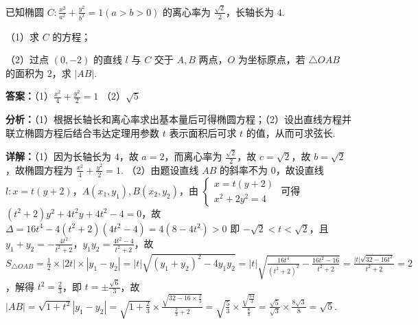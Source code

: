 \begin{question}[points=15]
已知椭圆 $C:\frac{x^2}{a^2}+\frac{y^2}{b^2}=1(a>b>0)$ 的离心率为 $\frac{\sqrt{2}}{2}$，长轴长为 $4$.

（1）求 $C$ 的方程；

（2）过点 $(0,-2)$ 的直线 $l$ 与 $C$ 交于 $A,B$ 两点，$O$ 为坐标原点，若 $\triangle OAB$ 的面积为 $2$，求 $|AB|$.
\begin{solution}
\textbf{答案：}（1）$\frac{x^2}{4}+\frac{y^2}{2}=1$
（2）$\sqrt{5}$

\textbf{分析：}（1）根据长轴长和离心率求出基本量后可得椭圆方程；（2）设出直线方程并联立椭圆方程后结合韦达定理用参数 $t$ 表示面积后可求 $t$ 的值，从而可求弦长.

\textbf{详解：}（1）因为长轴长为 $4$，故 $a=2$，而离心率为 $\frac{\sqrt{2}}{2}$，故 $c=\sqrt{2}$，故 $b=\sqrt{2}$，故椭圆方程为 $\frac{x^2}{4}+\frac{y^2}{2}=1$.
（2）由题设直线 $AB$ 的斜率不为 $0$，故设直线 $l:x=t(y+2)$，$A(x_1,y_1),B(x_2,y_2)$，由 $\begin{cases}x=t(y+2)\\x^2+2y^2=4\end{cases}$ 可得 $(t^2+2)y^2+4t^2y+4t^2-4=0$，故 $\Delta=16t^4-4(t^2+2)(4t^2-4)=4(8-4t^2)>0$ 即 $-\sqrt{2}<t<\sqrt{2}$，且 $y_1+y_2=-\frac{4t^2}{t^2+2}$，$y_1y_2=\frac{4t^2-4}{t^2+2}$，故 $S_{\triangle OAB}=\frac{1}{2}\times|2t|\times|y_1-y_2|=|t|\sqrt{(y_1+y_2)^2-4y_1y_2}=|t|\sqrt{\frac{16t^4}{(t^2+2)^2}-\frac{16t^2-16}{t^2+2}}=\frac{|t|\sqrt{32-16t^2}}{t^2+2}=2$，解得 $t^2=\frac{2}{3}$，即 $t=\pm\frac{\sqrt{6}}{3}$，故 $|AB|=\sqrt{1+t^2}|y_1-y_2|=\sqrt{1+\frac{2}{3}}\times\frac{\sqrt{32-16\times\frac{2}{3}}}{\frac{2}{3}+2}=\sqrt{\frac{5}{3}}\times\frac{\sqrt{\frac{64}{3}}}{\frac{8}{3}}=\frac{\sqrt{5}}{\sqrt{3}}\times\frac{8\sqrt{3}}{8}=\sqrt{5}$.
\end{solution}
\end{question}

